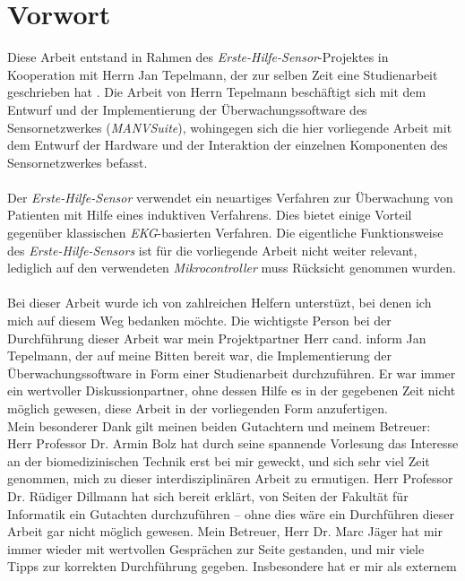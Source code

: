 \chapter*{Vorwort} 

Diese Arbeit entstand in Rahmen des \emph{Erste-Hilfe-Sensor}-Projektes in Kooperation mit Herrn Jan Tepelmann,
der zur selben Zeit eine Studienarbeit geschrieben hat \cite{Jan}. Die Arbeit von Herrn Tepelmann
beschäftigt sich mit dem Entwurf und der Implementierung der Überwachungssoftware des Sensornetzwerkes
(\emph{MANVSuite}), wohingegen sich die hier vorliegende Arbeit mit dem Entwurf der Hardware und der Interaktion der
einzelnen Komponenten des Sensornetzwerkes befasst.\\
\\
Der \emph{Erste-Hilfe-Sensor} verwendet ein neuartiges Verfahren zur Überwachung von Patienten mit Hilfe eines induktiven
Verfahrens. Dies bietet einige Vorteil gegenüber klassischen \emph{EKG}-basierten Verfahren. Die eigentliche Funktionsweise
des \emph{Erste-Hilfe-Sensors} ist für die vorliegende Arbeit nicht weiter relevant, lediglich auf den verwendeten
\emph{Mikrocontroller} muss Rücksicht genommen wurden.\\
\\
Bei dieser Arbeit wurde ich von zahlreichen Helfern unterstüzt, bei denen ich mich auf diesem Weg bedanken möchte. 
Die wichtigste Person bei der Durchführung dieser Arbeit war mein Projektpartner Herr cand. inform Jan Tepelmann, der 
auf meine Bitten bereit war, die Implementierung der Überwachungssoftware in Form einer Studienarbeit durchzuführen. Er
war immer ein wertvoller Diskussionpartner, ohne dessen Hilfe es in der gegebenen Zeit nicht möglich gewesen, 
diese Arbeit in der vorliegenden Form anzufertigen.\\
Mein besonderer Dank gilt meinen beiden Gutachtern und meinem Betreuer: Herr Professor Dr. Armin Bolz hat durch seine 
spannende Vorlesung das Interesse an der biomedizinischen Technik erst bei mir geweckt, und sich sehr viel Zeit 
genommen, mich zu dieser interdisziplinären Arbeit zu ermutigen. Herr Professor Dr. Rüdiger Dillmann hat sich bereit 
erklärt, von Seiten der Fakultät für Informatik ein Gutachten durchzuführen -- ohne dies wäre ein Durchführen 
dieser Arbeit gar nicht möglich gewesen. Mein Betreuer, Herr Dr. Marc Jäger hat mir immer wieder mit wertvollen Gesprächen
zur Seite gestanden, und mir viele Tipps zur korrekten Durchführung gegeben. Insbesondere hat er mir als externem 
